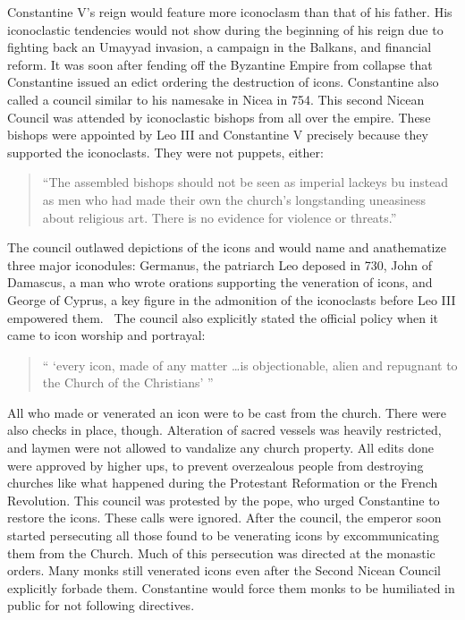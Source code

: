 \documentclass[12pt]{article}
\begin{document}
    Constantine V's reign would feature more iconoclasm than that of his father. His iconoclastic tendencies would not show during the beginning of his reign due to fighting back an Umayyad invasion, a campaign in the Balkans, and financial reform. It was soon after fending off the Byzantine Empire from collapse that Constantine issued an edict ordering the destruction of icons. Constantine also called a council similar to his namesake in Nicea in 754. This second Nicean Council was attended by iconoclastic bishops from all over the empire. These bishops were appointed by Leo III and Constantine V precisely because they supported the iconoclasts. They were not puppets, either: \begin{quote}
        ``The assembled bishops should not be seen as imperial lackeys bu instead as men who had made their own the church's longstanding uneasiness about religious art. There is no evidence for violence or threats.''~\cite[p. 63]{Noble2} 
    \end{quote}\noindent
    The council outlawed depictions of the icons and would name and anathematize three major iconodules: Germanus, the patriarch Leo deposed in 730, John of Damascus, a man who wrote orations supporting the veneration of icons, and George of Cyprus, a key figure in the admonition of the iconoclasts before Leo III empowered them.~\cite[p. 64]{Noble2}  The council also explicitly stated the official policy when it came to icon worship and portrayal: \begin{quote}
        `` `every icon, made of any matter \dots is objectionable, alien and repugnant to the Church of the Christians' ''~\cite[p. 64]{Noble2}
    \end{quote}\noindent
    All who made or venerated an icon were to be cast from the church. There were also checks in place, though. Alteration of sacred vessels was heavily restricted, and laymen were not allowed to vandalize any church property. All edits done were approved by higher ups, to prevent overzealous people from destroying churches like what happened during the Protestant Reformation or the French Revolution. This council was protested by the pope, who urged Constantine to restore the icons. These calls were ignored. After the council, the emperor soon started persecuting all those found to be venerating icons by excommunicating them from the Church. Much of this persecution was directed at the monastic orders. Many monks still venerated icons even after the Second Nicean Council explicitly forbade them. Constantine would force them monks to be humiliated in public for not following directives. \
\end{document}
